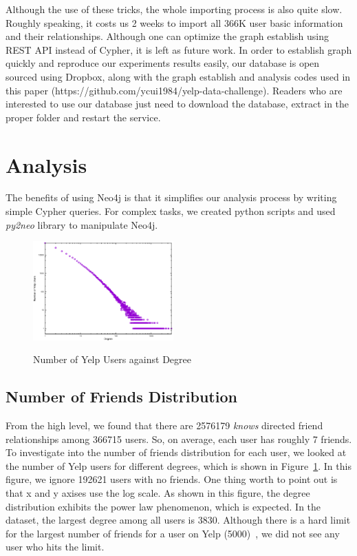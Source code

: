\documentclass[10pt]{sig-alternate-10pt}   	%
\begin{document}
Although the use of these tricks, the whole importing process is also quite slow. Roughly speaking, it costs us 2 weeks to 
import all 366K user basic information and their relationships. Although one can optimize the graph establish using REST API 
instead of Cypher, it is left as future work. In order to establish graph quickly and reproduce our experiments results easily, 
our database is open sourced using Dropbox, along with the graph establish and analysis codes used in this paper (https://github.com/ycui1984/yelp-data-challenge). Readers who are interested to use our database just need to download the database, extract
in the proper folder and restart the service. 

\section{Analysis}
The benefits of using Neo4j is that it simplifies our analysis process by writing simple Cypher queries. For complex 
tasks, we created python scripts and used \textit{py2neo} library to manipulate Neo4j. 

\begin{figure}[t]
  \centering
  \caption{Number of Yelp Users against Degree} 
       \includegraphics[width=0.48\textwidth]{figures/degree-distribution.eps}
  \label{fig:degree-dis}
\end{figure}

\subsection{Number of Friends Distribution} 
From the high level, we found that there are 2576179 \textit{knows} directed friend relationships among 366715 users. 
So, on average, each user has roughly 7 friends. To investigate into the number of friends distribution for each user, 
we looked at the number of Yelp users for different degrees, which is shown in Figure~\ref{fig:degree-dis}. In this figure, 
we ignore 192621 users with no friends. One thing worth to point out is that x and y axises use the log scale. 
As shown in this figure,  the degree distribution exhibits the power law phenomenon, which is expected. 
In the dataset, the largest degree among all users is 3830.  Although there is a hard limit for the largest number of 
friends for a user on Yelp (5000)~\cite{limit}, we did not see any user who hits the limit.   
\end{document}
